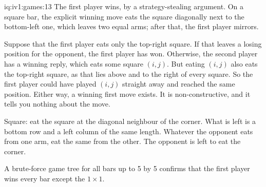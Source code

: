 \begin{solution}{iq:iv1:games:13}
The first player wins, by a strategy-stealing argument. On a square bar, the explicit winning move eats the square diagonally next to the bottom-left one, which leaves two equal arms; after that, the first player mirrors.

Suppose that the first player eats only the top-right square. If that leaves a losing position for the opponent, the first player has won. Otherwise, the second player has a winning reply, which eats some square $(i, j)$. But eating $(i, j)$ also eats the top-right square, as that lies above and to the right of every square. So the first player could have played $(i, j)$ straight away and reached the same position. Either way, a winning first move exists. It is non-constructive, and it tells you nothing about the move.

Square: eat the square at the diagonal neighbour of the corner. What is left is a bottom row and a left column of the same length. Whatever the opponent eats from one arm, eat the same from the other. The opponent is left to eat the corner.

A brute-force game tree for all bars up to 5 by 5 confirms that the first player wins every bar except the $1 \times 1$.

\end{solution}

